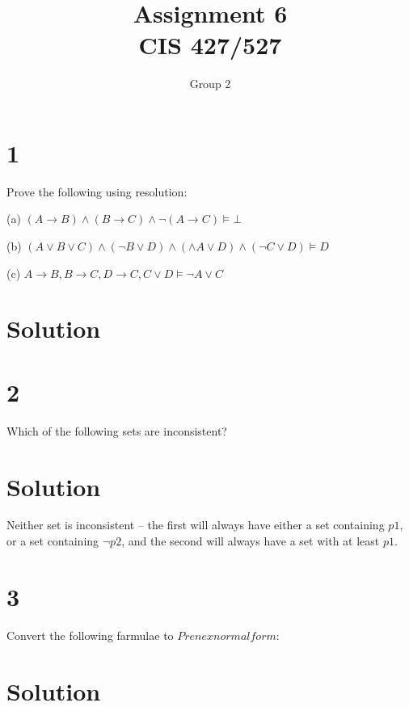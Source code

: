 \documentclass[10pt]{article}
\begin{document}
\title{Assignment \raisebox{.22ex}{\large\#}6 \\
	CIS 427/527}
\author{Group 2}

\maketitle

\section*{1}
Prove the following using resolution:

\begin{description*}
\item[(a)] $(A\to B)\land (B\to C)\land \lnot(A\to C)\models \bot$
\item[(b)] $(A\lor B\lor C)\land (\lnot B\lor D)\land (\land A\lor D)\land (\lnot C \lor D) \models D$
\item[(c)] $A\to B, B\to C, D\to C, C\lor D \models \lnot A \lor C$
\end{description*}

\section*{Solution}

\section*{2}
Which of the following sets are inconsistent?
\section*{Solution}
Neither set is inconsistent -- the first will always have either a set containing $p1$, or a set containing $\lnot p2$, and the second will always have a set with at least $p1$.
\section*{3}
Convert the following farmulae to $Prenex normal form$:
\section*{Solution}

\end{document}
